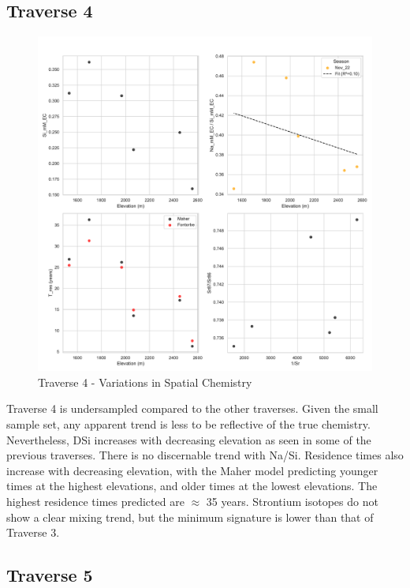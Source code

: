 \subsection{Traverse 4}

\begin{figure}[h]
    \centering
        \includegraphics[width=\textwidth]{Traverse_4_summary.pdf}
    \caption{Traverse 4 - Variations in Spatial Chemistry}
    \label{fig:spatial_changes_spring4}
\end{figure}

\FloatBarrier

Traverse 4 is undersampled compared to the other traverses. Given the small sample set, any apparent trend is less to be reflective of the true chemistry. Nevertheless, DSi increases with decreasing elevation as seen in some of the previous traverses. There is no discernable trend with Na/Si. Residence times also increase with decreasing elevation, with the Maher model predicting younger times at the highest elevations, and older times at the lowest elevations. The highest residence times predicted are $\approx$ 35 years. Strontium isotopes do not show a clear mixing trend, but the minimum signature is lower than that of Traverse 3.

\newpage

\subsection{Traverse 5}

